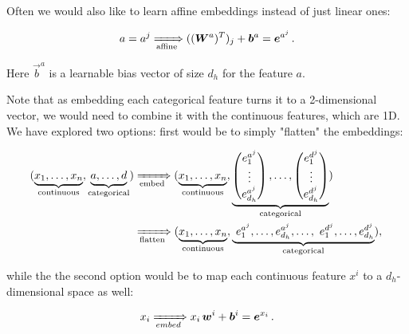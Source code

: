 Often we would also like to learn affine embeddings instead of just linear ones:

\begin{equation}
    a = a^j \xRightarrow[\text{affine}]{} ((\vec{W}^a)^T)_j + \vec{b}^a = \vec{e}^{a^j}\,.
\end{equation}

Here $\vec{b}^a$ is a learnable bias vector of size $d_h$ for the feature $a$.

Note that as embedding each categorical feature turns it to a 2-dimensional vector, we would need to combine it
with the continuous features, which are 1D. We have explored two options: first would be to simply "flatten" the
embeddings:

\begin{align}
    (\underbrace{x_1, \dots, x_n}_\text{continuous},
    \underbrace{a, \dots, d}_\text{categorical})
     & \xRightarrow[\text{embed}]{}
    (\underbrace{x_1, \dots, x_n}_\text{continuous},
    \underbrace{\begin{pmatrix}
                        e^{a^j}_1 \\ \vdots \\ e^{a^j}_{d_h}
                    \end{pmatrix}, \dots,
    \begin{pmatrix}
            e^{d^j}_1 \\ \vdots \\ e^{d^j}_{d_h}
        \end{pmatrix}}_\text{categorical}) \\
     & \xRightarrow[\text{flatten}]{}
    (\underbrace{x_1, \dots, x_n}_\text{continuous},
    \underbrace{\,\, e^{a^j}_1,\dots, e^{a^j}_{d_h}, \dots,
        \,\, e^{d^j}_1, \dots, e^{d^j}_{d_h}}_\text{categorical}),\,
\end{align}

while the the second option would be to map each continuous feature $x^i$ to a $d_h$-dimensional space as well:

\begin{equation}
    x_i \xRightarrow[embed]{} x_i \, \vec{w}^i + \vec{b}^i = \vec{e}^{x_i}\,.
\end{equation}


